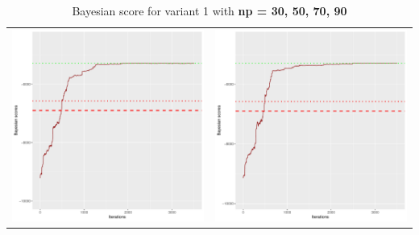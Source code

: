 \documentclass[]{scrartcl}
\begin{document}
\begin{table}[h!]
\begin{tabular}{cc}
\includegraphics[scale = 0.4]{./figs/alarm/v1/70/bayBoundsEvolution-3502.pdf} & 
\includegraphics[scale = 0.4]{./figs/alarm/v1/90/bayBoundsEvolution-3502.pdf} \\
\end{tabular}
\caption{Bayesian score for variant 1 with \textbf{np =  30, 50, 70, 90 }}
\end{table}
\end{document}
